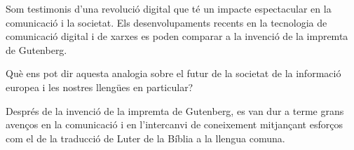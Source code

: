 \documentclass[]{../../metanetpaper}
\begin{document}
\clearpage



\begin{multicols}{2}

Som testimonis d’una revolució digital que té un impacte espectacular en la comunicació i la societat. Els desenvolupaments recents en la tecnologia de comunicació digital i de xarxes es poden comparar a la invenció de la impremta de Gutenberg.

Què ens pot dir aquesta analogia sobre el futur de la societat de la informació europea i les nostres llengües en particular?

Després de la invenció de la impremta de Gutenberg, es van dur a terme grans avenços en la comunicació i en l’intercanvi de coneixement mitjançant esforços com el de la traducció de Luter de la Bíblia a la llengua comuna.


\end{multicols}
\end{document}
